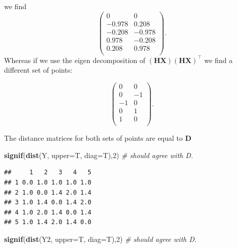 \documentclass[]{book}
\newenvironment{Shaded}{\begin{snugshade}}{\end{snugshade}}
\newcommand{\CommentTok}[1]{\textcolor[rgb]{0.56,0.35,0.01}{\textit{#1}}}
\newcommand{\DataTypeTok}[1]{\textcolor[rgb]{0.13,0.29,0.53}{#1}}
\newcommand{\DecValTok}[1]{\textcolor[rgb]{0.00,0.00,0.81}{#1}}
\newcommand{\KeywordTok}[1]{\textcolor[rgb]{0.13,0.29,0.53}{\textbf{#1}}}
\newcommand{\NormalTok}[1]{#1}
\newcommand{\OperatorTok}[1]{\textcolor[rgb]{0.81,0.36,0.00}{\textbf{#1}}}
\newcommand{\StringTok}[1]{\textcolor[rgb]{0.31,0.60,0.02}{#1}}
\theoremstyle{definition}
\theoremstyle{definition}
\theoremstyle{definition}
\theoremstyle{remark}
\begin{document}
we find
\[\begin{pmatrix}0&0 \\-0.978&0.208 \\-0.208&-0.978 \\0.978&-0.208 \\0.208&0.978 \\\end{pmatrix}.\]
Whereas if we use the eigen decomposition of \((\mathbf H\mathbf X)(\mathbf H\mathbf X)^\top\) we find a different set of points:

\begin{Shaded}
\end{Shaded}

\[\begin{pmatrix}0&0 \\0&-1 \\-1&0 \\0&1 \\1&0 \\\end{pmatrix}.\]

The distance matrices for both sets of points are equal to \(\mathbf D\)

\begin{Shaded}
\begin{Highlighting}[]
\KeywordTok{signif}\NormalTok{(}\KeywordTok{dist}\NormalTok{(Y, }\DataTypeTok{upper=}\NormalTok{T, }\DataTypeTok{diag=}\NormalTok{T),}\DecValTok{2}\NormalTok{) }\CommentTok{# should agree with D.}
\end{Highlighting}
\end{Shaded}

\begin{verbatim}
##     1   2   3   4   5
## 1 0.0 1.0 1.0 1.0 1.0
## 2 1.0 0.0 1.4 2.0 1.4
## 3 1.0 1.4 0.0 1.4 2.0
## 4 1.0 2.0 1.4 0.0 1.4
## 5 1.0 1.4 2.0 1.4 0.0
\end{verbatim}

\begin{Shaded}
\begin{Highlighting}[]
\KeywordTok{signif}\NormalTok{(}\KeywordTok{dist}\NormalTok{(Y2, }\DataTypeTok{upper=}\NormalTok{T, }\DataTypeTok{diag=}\NormalTok{T),}\DecValTok{2}\NormalTok{) }\CommentTok{# should agree with D.}
\end{Highlighting}
\end{Shaded}
\end{document}

